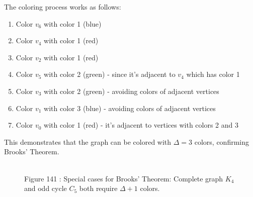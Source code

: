 \documentclass{article}
\theoremstyle{definition}
\begin{document}
The coloring process works as follows:
\begin{enumerate}
    \item Color $v_6$ with color 1 (blue)
    \item Color $v_4$ with color 1 (red)
    \item Color $v_2$ with color 1 (red)
    \item Color $v_5$ with color 2 (green) - since it's adjacent to $v_4$ which has color 1
    \item Color $v_3$ with color 2 (green) - avoiding colors of adjacent vertices
    \item Color $v_1$ with color 3 (blue) - avoiding colors of adjacent vertices
    \item Color $v_0$ with color 1 (red) - it's adjacent to vertices with colors 2 and 3
\end{enumerate}

This demonstrates that the graph can be colored with $\Delta = 3$ colors, confirming Brooks' Theorem.

\begin{figure}[ht]
\centering
{}
\\
\small Figure 141 : {Special cases for Brooks' Theorem: Complete graph $K_4$ and odd cycle $C_5$ both require $\Delta+1$ colors.}
\end{figure}
\end{document}
